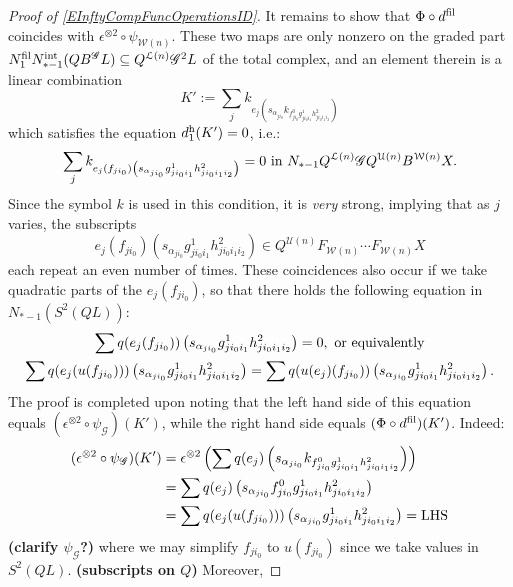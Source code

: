 \documentclass[11pt]{amsart}
\theoremstyle{plain}
\theoremstyle{definition}
\newcommand{\scrG}{\mathscr{G}}
\newcommand{\calW}{\mathcal{W}}
\newcommand{\calU}{\mathcal{U}}
\newcommand{\calL}{\mathcal{L}}
\theoremstyle{plain}
\newcommand{\BSW}{{\scrG}}
\newcommand{\BSWres}{B^\BSW}%
\begin{document}
\begin{Composite functor spectral sequences}
\begin{tricky proofs of operation compatibilities}
\begin{proof}[Proof of \ref{EInftyCompFuncOperationsID}]
It remains to show that $\Phi\circ d^\textup{fil}$ coincides with $\epsilon^{\otimes 2}\circ\psi_{\calW(n)}$. These two maps are only nonzero on the graded part $N_1^\textup{fil}N_{*-1}^\textup{int}(Q\BSWres L)\subseteq Q^{\calL(n)}\BSW^2 L$ of the total complex, and an element therein is a linear combination
\[K':=\sum_j k_{e_j\left(s_{\alpha_{ji_0}} k_{f^0_{ji_0}g^1_{ji_0i_1}h^2_{ji_0i_1i_2}}\right)}\]
which satisfies the equation $d_1^\textup{h}(K')=0$, i.e.:
\[\sum_j k_{e_j(f_{ji_0})\left(s_{\alpha_{ji_0}} {g^1_{ji_0i_1}h^2_{ji_0i_1i_2}}\right)}=0\textup{ in }N_{*-1}Q^{\calL(n)}\BSW Q^{\calU(n)}B^{\calW(n)}X.\]
Since the symbol $k$ is used in this condition, it is \emph{very} strong, implying that as $j$ varies, the subscripts 
\[e_j(f_{ji_0})\left(s_{\alpha_{ji_0}} {g^1_{ji_0i_1}h^2_{ji_0i_1i_2}}\right)\in Q^{\calU(n)}F_{\calW(n)}\cdots F_{\calW(n)}X\]
each repeat an even number of times. %
These coincidences also occur if we take quadratic parts of the $e_j(f_{ji_0})$, so that there holds the following equation in $N_{*-1}(S^2(QL))$:
\begin{gather*}
\sum q(e_j(f_{ji_0}))\left(s_{\alpha_{ji_0}} {g^1_{ji_0i_1}h^2_{ji_0i_1i_2}}\right)=0,\textup{ or equivalently}\\
\sum q(e_j(u(f_{ji_0})))\left(s_{\alpha_{ji_0}} {g^1_{ji_0i_1}h^2_{ji_0i_1i_2}}\right)
=
\sum q(u(e_j)(f_{ji_0}))\left(s_{\alpha_{ji_0}} {g^1_{ji_0i_1}h^2_{ji_0i_1i_2}}\right).
\end{gather*}
The proof is completed upon noting that the left hand side of this equation equals $(\epsilon^{\otimes 2}\circ \psi_{\BSW})(K')$, while the right hand side equals $(\Phi\circ d^\textup{fil})(K')$. Indeed:
\begin{alignat*}{2}
(\epsilon^{\otimes 2}\circ \psi_{\BSW})(K')
&=
\epsilon^{\otimes 2}\left(\sum q(e_j)\left(s_{\alpha_{ji_0}} k_{f^0_{ji_0}g^1_{ji_0i_1}h^2_{ji_0i_1i_2}}\right)\right)%
\\
&=
\sum q(e_j)\left(s_{\alpha_{ji_0}} f^0_{ji_0}g^1_{ji_0i_1}h^2_{ji_0i_1i_2}\right)%
\\
&=
\sum q(e_j(u(f_{ji_0})))\left(s_{\alpha_{ji_0}} g^1_{ji_0i_1}h^2_{ji_0i_1i_2}\right)=\textup{LHS}
\end{alignat*}
\textbf{(clarify $\psi_{\BSW}$?)} where we may simplify $f_{ji_0}$ to $u(f_{ji_0})$ since we take values in $S^2(QL)$. \textbf{(subscripts on $Q$)} Moreover,

\end{proof}
\end{tricky proofs of operation compatibilities}
\end{Composite functor spectral sequences}
\end{document}
